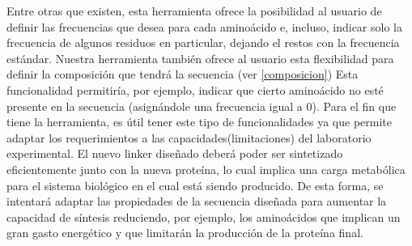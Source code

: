 Entre otras que existen, esta herramienta ofrece la posibilidad al usuario de definir las frecuencias que desea para cada aminoácido e, incluso,
indicar solo la frecuencia de algunos residuos en particular, dejando el restos con la frecuencia estándar. 
Nuestra herramienta también ofrece al usuario esta flexibilidad para definir la composición que tendrá la secuencia (ver \ref{composicion})
Esta funcionalidad permitiría, por ejemplo, indicar que cierto aminoácido no esté presente en la secuencia (asignándole una frecuencia igual a 0). 
Para el fin que tiene la herramienta, es útil tener este tipo de funcionalidades ya que permite adaptar los requerimientos a las capacidades(limitaciones) del laboratorio experimental. 
El nuevo linker diseñado deberá poder ser sintetizado eficientemente junto con la nueva proteína, lo cual implica una carga metabólica para el sistema biológico en el cual está siendo producido. 
De esta forma, se intentará adaptar las propiedades de la secuencia diseñada para aumentar la capacidad de síntesis reduciendo, por ejemplo, los aminoácidos que implican un gran gasto energético y que limitarán la producción de la proteína final.










